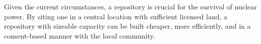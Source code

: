 \begin{table}[h]

\centering
\caption {Metrics and Weight for Each Stakeholder}
\label{tab:stakeholders}
\end{table}

Given the current circumstances, a repository is crucial for the survival of nuclear
power. By siting one in a central location with sufficient licensed land,
a repository with sizeable capacity can be built cheaper, more efficiently, and 
in a consent-based manner with the local community. 
